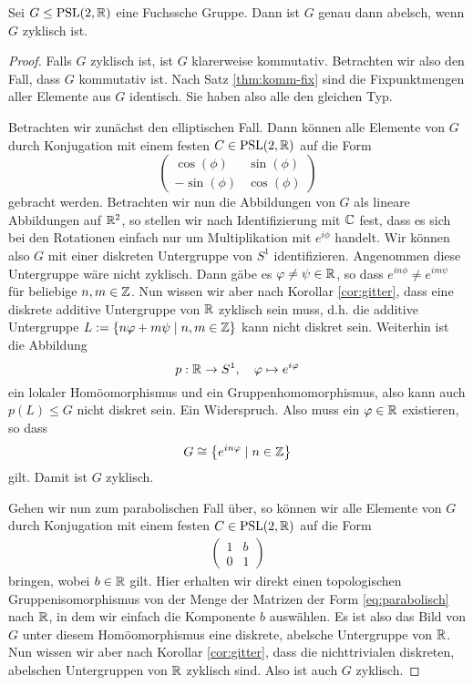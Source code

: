 \begin{thm}
  \label{thm:abelsch-zyklisch}
  Sei $G \leq \operatorname{PSL}(2, \mathbb{R})$ eine Fuchssche Gruppe. Dann ist $G$ genau
  dann abelsch, wenn $G$ zyklisch ist.
\end{thm}

\begin{proof}
  Falls $G$ zyklisch ist, ist $G$ klarerweise kommutativ. Betrachten
  wir also den Fall, dass $G$ kommutativ ist. Nach Satz
  \ref{thm:komm-fix} sind die Fixpunktmengen aller Elemente aus $G$
  identisch. Sie haben also alle den gleichen Typ.

  Betrachten wir zunächst den elliptischen Fall. Dann können alle
  Elemente von $G$ durch Konjugation mit einem festen $C \in \operatorname{PSL}(2,\mathbb{R})$ auf
  die Form
  \[
  \begin{pmatrix}
    \cos(\phi) & \sin(\phi) \\
    -\sin(\phi) & \cos(\phi)
  \end{pmatrix}
  \]
  gebracht werden. Betrachten wir nun die Abbildungen von $G$ als
  lineare Abbildungen auf $\mathbb{R}^2$, so stellen wir nach Identifizierung
  mit $\mathbb{C}$ fest, dass es sich bei den Rotationen einfach nur um
  Multiplikation mit $e^{i\phi}$ handelt. Wir können also $G$ mit
  einer diskreten Untergruppe von $S^1$ identifizieren. Angenommen
  diese Untergruppe wäre nicht zyklisch. Dann gäbe es $\varphi \neq \psi
  \in \mathbb{R}$, so dass $e^{in\phi} \neq e^{im\psi}$ für beliebige $n, m
  \in \mathbb{Z}$. Nun wissen wir aber nach Korollar \ref{cor:gitter}, dass
  eine diskrete additive Untergruppe von $\mathbb{R}$ zyklisch sein muss,
  d.h. die additive Untergruppe $L := \{ n \varphi + m \psi \mid n,m \in
  \mathbb{Z}\}$ kann nicht diskret sein. Weiterhin ist die Abbildung
  \[
  p: \mathbb{R} \rightarrow S^1, \quad \varphi \mapsto e^{i\varphi}
  \]
  ein lokaler Homöomorphismus und ein Gruppenhomomorphismus, also kann auch $p(L) \leq G$ nicht diskret sein. Ein
  Widerspruch. Also muss ein $\varphi \in \mathbb{R}$ existieren, so dass
  \[
  G \cong \left \{ e^{in\varphi} \mid n \in \mathbb{Z} \right \}
  \]
  gilt. Damit ist $G$ zyklisch.

  Gehen wir nun zum parabolischen Fall über, so können wir alle
  Elemente von $G$ durch Konjugation mit einem festen $C \in \operatorname{PSL}(2,
  \mathbb{R})$ auf die Form
  \begin{align}
    \label{eq:parabolisch}
  \begin{pmatrix}
    1 & b\\
    0 & 1
  \end{pmatrix}
  \end{align}
  bringen, wobei $b \in \mathbb{R}$ gilt. Hier erhalten wir direkt einen
  topologischen Gruppenisomorphismus von der Menge der Matrizen der Form
  \eqref{eq:parabolisch} nach $\mathbb{R}$, in dem wir einfach die Komponente
  $b$ auswählen. Es ist also das Bild von $G$ unter diesem
  Homöomorphismus eine diskrete, abelsche
  Untergruppe von $\mathbb{R}$. Nun wissen wir aber nach Korollar \ref{cor:gitter},
  dass die nichttrivialen diskreten, abelschen Untergruppen von $\mathbb{R}$
  zyklisch sind. Also ist auch $G$ zyklisch.


\end{proof}
